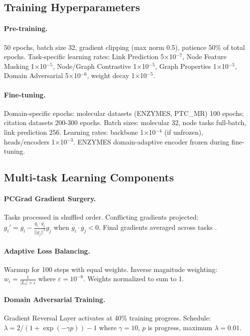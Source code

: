 \documentclass[11pt]{article}
\begin{document}
\subsection{Training Hyperparameters}

\paragraph{Pre-training.} 50 epochs, batch size 32, gradient clipping (max norm 0.5), patience 50\% of total epochs. Task-specific learning rates: Link Prediction 5×10$^{-7}$, Node Feature Masking 1×10$^{-5}$, Node/Graph Contrastive 1×10$^{-5}$, Graph Properties 1×10$^{-5}$, Domain Adversarial 5×10$^{-6}$, weight decay 1×10$^{-5}$.

\paragraph{Fine-tuning.} Domain-specific epochs: molecular datasets (ENZYMES, PTC\_MR) 100 epochs; citation datasets 200-300 epochs. Batch sizes: molecular 32, node tasks full-batch, link prediction 256. Learning rates: backbone 1×10$^{-4}$ (if unfrozen), heads/encoders 1×10$^{-3}$. ENZYMES domain-adaptive encoder frozen during fine-tuning.

\subsection{Multi-task Learning Components}

\paragraph{PCGrad Gradient Surgery.} Tasks processed in shuffled order. Conflicting gradients projected: $g_i' = g_i - \frac{g_i \cdot g_j}{||g_j||^2} g_j$ when $g_i \cdot g_j < 0$. Final gradients averaged across tasks \citep{yu2020pcgrad}.

\paragraph{Adaptive Loss Balancing.} Warmup for 100 steps with equal weights. Inverse magnitude weighting: $w_i = \frac{1}{|L_i| + \varepsilon}$ where $\varepsilon = 10^{-8}$. Weights normalized to sum to 1.

\paragraph{Domain Adversarial Training.} Gradient Reversal Layer activates at 40\% training progress. Schedule: $\lambda = 2/(1 + \exp(-\gamma p)) - 1$ where $\gamma = 10$, $p$ is progress, maximum $\lambda = 0.01$.
\end{document}
